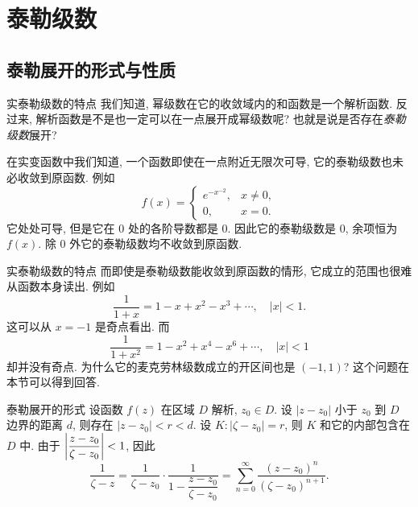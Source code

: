 \section{泰勒级数}

\subsection{泰勒展开的形式与性质}

\begin{frame}{实泰勒级数的特点}
	\onslide<+->
	我们知道, 幂级数在它的收敛域内的和函数是一个解析函数.
	\onslide<+->
	反过来, 解析函数是不是也一定可以在一点展开成幂级数呢? 也就是说是否存在\emph{泰勒级数}展开?

	\onslide<+->
	在实变函数中我们知道, 一个函数即使在一点附近无限次可导, 它的泰勒级数也未必收敛到原函数.
	\onslide<+->
	例如
	\[f(x)=\begin{cases}
	e^{-x^{-2}},&x\neq 0,\\
	0,&x=0.\end{cases}\]
	\onslide<+->
	它处处可导, 但是它在 $0$ 处的各阶导数都是 $0$.
	\onslide<+->
	因此它的泰勒级数是 $0$, 余项恒为 $f(x)$.
	\onslide<+->
	除 $0$ 外它的泰勒级数均不收敛到原函数.
\end{frame}


\begin{frame}{实泰勒级数的特点}
	\onslide<+->
	而即使是泰勒级数能收敛到原函数的情形, 它成立的范围也很难从函数本身读出.
	\onslide<+->
	例如
	\[\dfrac1{1+x}=1-x+x^2-x^3+\cdots,\quad|x|<1.\]
	\onslide<+->
	这可以从 $x=-1$ 是奇点看出.
	\onslide<+->
	而
	\[\dfrac1{1+x^2}=1-x^2+x^4-x^6+\cdots,\quad|x|<1\]
	却并没有奇点.
	\onslide<+->
	为什么它的麦克劳林级数成立的开区间也是 $(-1,1)$?
	\onslide<+->
	这个问题在本节可以得到回答.
\end{frame}


\begin{frame}{泰勒展开的形式}
	\onslide<+->
	设函数 $f(z)$ 在区域 $D$ 解析, $z_0\in D$.
	\onslide<+->
	设 $|z-z_0|$ 小于 $z_0$ 到 $D$ 边界的距离 $d$,
	则存在 $|z-z_0|<r<d$.
	\onslide<+->
	设 $K:|\zeta-z_0|=r$, 则 $K$ 和它的内部包含在 $D$ 中.
	\onslide<+->
	由于 $\left|\dfrac{z-z_0}{\zeta-z_0}\right|<1$, 因此
	\[\frac1{\zeta-z}=\frac1{\zeta-z_0}\cdot\frac1{1-\dfrac{z-z_0}{\zeta-z_0}}=\sum_{n=0}^\infty\frac{(z-z_0)^n}{(\zeta-z_0)^{n+1}}.\]

	\begin{center}
	\end{center}
\end{frame}


